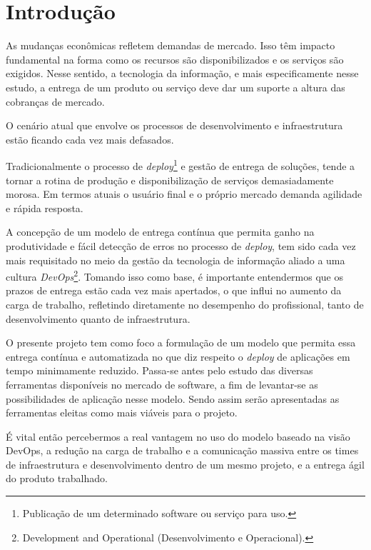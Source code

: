 
\chapter{Introdução}\label{intro}

As mudanças econômicas refletem demandas de mercado. Isso têm impacto fundamental na forma como os recursos são disponibilizados e os serviços são exigidos. Nesse sentido, a tecnologia da informação, e mais especificamente nesse estudo, a entrega de um produto ou serviço deve dar um suporte a altura das cobranças de mercado.

O cenário atual que envolve os processos de desenvolvimento e infraestrutura estão ficando cada vez mais defasados.

Tradicionalmente o processo de \textit{deploy}\footnote{Publicação de um determinado software ou serviço para uso.} e gestão de entrega de soluções, tende a tornar a rotina de produção e disponibilização de serviços demasiadamente morosa. Em termos atuais o usuário final e o próprio mercado demanda agilidade e rápida resposta.

A concepção de um modelo de entrega contínua que permita ganho na produtividade e fácil detecção de erros no processo de \textit{deploy}, tem sido cada vez mais requisitado no meio da gestão da tecnologia de informação aliado a uma cultura \textit{DevOps}\footnote{Development and Operational (Desenvolvimento e Operacional).}. Tomando isso como base, é importante entendermos que os prazos de entrega estão cada vez mais apertados, o que influi no aumento da carga de trabalho, refletindo diretamente no desempenho do profissional, tanto de desenvolvimento quanto de infraestrutura.

O presente projeto tem como foco a formulação de um modelo que permita essa entrega contínua e automatizada no que diz respeito o \textit{deploy} de aplicações em tempo minimamente reduzido. Passa-se antes pelo estudo das diversas ferramentas disponíveis no mercado de software, a fim de levantar-se as possibilidades de aplicação nesse modelo. Sendo assim serão apresentadas as ferramentas eleitas como mais viáveis para o projeto.

É vital então percebermos a real vantagem no uso do modelo baseado na visão DevOps, a redução na carga de trabalho e a comunicação massiva entre os times de infraestrutura e desenvolvimento dentro de um mesmo projeto, e a entrega ágil do produto trabalhado.

